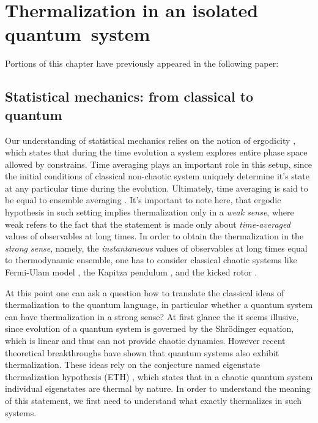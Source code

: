 
\chapter{Thermalization in an isolated quantum~system}

Portions of this chapter have previously appeared in the following paper:


\section{Statistical mechanics: from  classical to quantum}

Our understanding of statistical mechanics relies on the notion of ergodicity \cite{Penrose1970, Dalessio2016}, which states that during the time evolution a system explores entire phase space allowed by constrains. Time averaging plays an important role in this setup, since the initial conditions of classical non-chaotic system uniquely determine it's state at any particular time during the evolution. Ultimately, time averaging is said to be equal to ensemble averaging \cite{Penrose1970, Dalessio2016}. It's important to note here, that ergodic hypothesis in such setting implies thermalization only in a \textit{weak sense}, where weak refers to the fact that the statement is made only about \textit{time-averaged} values of observables at long times. In order to obtain the thermalization in the \textit{strong sense}, namely, the \textit{instantaneous} values of observables at long times equal to thermodynamic ensemble, one has to consider classical chaotic systems like Fermi-Ulam model \cite{Lichtenberg1992}, the Kapitza pendulum \cite{Broer2004}, and the kicked rotor \cite{Chirikov1979}.

At this point one can ask a question how to translate the classical ideas of thermalization to the quantum language, in particular whether a quantum system can have thermalization in a strong sense? At first glance the it seems illusive, since evolution of a quantum system is governed by the Shr\"odinger equation, which is linear and thus can not provide chaotic dynamics. However recent theoretical breakthroughs \cite{Deutsch1991, Srednicki1994, Rigol2008} have shown that quantum systems also exhibit thermalization. These ideas rely on the conjecture named eigenstate thermalization hypothesis (ETH) \cite{Srednicki1999}, which states that in a chaotic quantum system individual eigenstates are thermal by nature. In order to understand the meaning of this statement, we first need to understand what exactly thermalizes in such systems.

